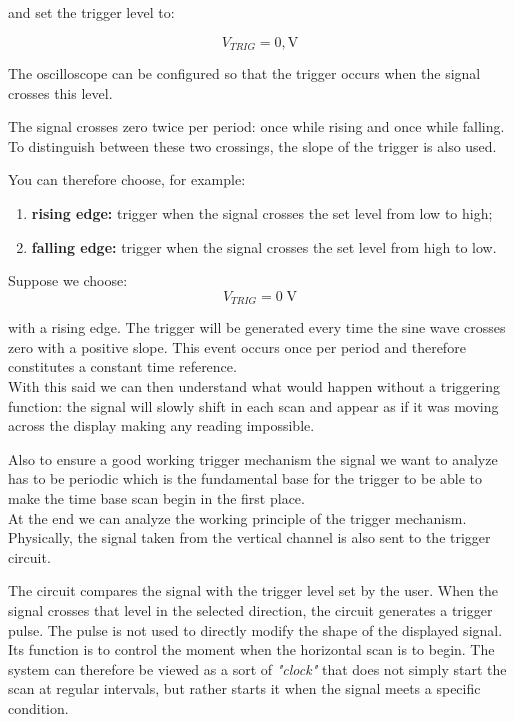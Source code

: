 \documentclass[../main.tex]{subfiles}
\begin{document}
and set the trigger level to:

\begin{equation}
	V_{TRIG}=0,\text{V}
\end{equation}

The oscilloscope can be configured so that the trigger occurs when the signal crosses this level.

The signal crosses zero twice per period: once while rising and once while falling. To distinguish between these two crossings, the slope of the trigger is also used.

You can therefore choose, for example: 

\begin{enumerate}[label=\textbf{-}]
	\item \textbf{rising edge:} trigger when the signal crosses the set level from low to high;
	\item \textbf{falling edge:} trigger when the signal crosses the set level from high to low.\\
\end{enumerate}

Suppose we choose:
\begin{equation}
	V_{TRIG}=0 \; \text{V}
\end{equation}


with a rising edge. The trigger will be generated every time the sine wave crosses zero with a positive slope. This event occurs once per period and therefore constitutes a constant time reference.\\

With this said we can then understand what would happen without a triggering function: the signal will slowly shift in each scan and appear as if it was moving across the display making any reading impossible.

Also to ensure a good working trigger mechanism the signal we want to analyze has to be periodic which is the fundamental base for the trigger to be able to make the time base scan begin in the first place.\\

At the end we can analyze the working principle of the trigger mechanism. Physically, the signal taken from the vertical channel is also sent to the trigger circuit.

The circuit compares the signal with the trigger level set by the user. When the signal crosses that level in the selected direction, the circuit generates a trigger pulse. The pulse is not used to directly modify the shape of the displayed signal. 
Its function is to control the moment when the horizontal scan is to begin. The system can therefore be viewed as a sort of \textit{"clock"} that does not simply start the scan at regular intervals, but rather starts it when the signal meets a specific condition.\\
\end{document}
